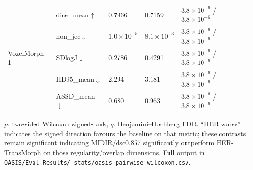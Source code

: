 \documentclass[11pt,a4paper]{article}
\begin{document}
\begin{table}[H]
\begin{tabularx}{\textwidth}{llXXX}
\midrule
\multirow{5}{*}{VoxelMorph-1} & dice\_mean\(\uparrow\) & 0.7966 & 0.7159 & $3.8\times10^{-6}$ / $3.8\times10^{-6}$ \\
 & non\_jec\(\downarrow\) & $1.0\times10^{-5}$ & $8.1\times10^{-3}$ & $3.8\times10^{-6}$ / $3.8\times10^{-6}$ \\
 & SDlogJ\(\downarrow\) & 0.2786 & 0.4291 & $3.8\times10^{-6}$ / $3.8\times10^{-6}$ \\
 & HD95\_mean\(\downarrow\) & 2.294 & 3.181 & $3.8\times10^{-6}$ / $3.8\times10^{-6}$ \\
 & ASSD\_mean\(\downarrow\) & 0.680 & 0.963 & $3.8\times10^{-6}$ / $3.8\times10^{-6}$ \\
\bottomrule
\end{tabularx}
\parbox{\textwidth}{\footnotesize $p$: two-sided Wilcoxon signed-rank; $q$: Benjamini--Hochberg FDR. ``HER worse'' indicates the signed direction favours the baseline on that metric; these contrasts remain significant indicating MIDIR/dsc0.857 significantly outperform HER-TransMorph on those regularity/overlap dimensions. Full output in \texttt{OASIS/Eval\_Results/\_stats/oasis\_pairwise\_wilcoxon.csv}.}
\end{table}
\end{document}
